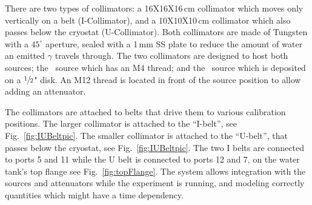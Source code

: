 \begin{figure}
\begin{minipage}[c]{0.4\textwidth}
    \end{minipage} 
    \label{fig:Colimator}
\end{figure}

There are two types of collimators: a 16X16X16\,cm collimator which moves only vertically on a belt (I-Collimator), and a 10X10X10\,cm collimator which also passes below the cryostat (U-Collimator). 
Both collimators are made of Tungsten with a $45^{\circ}$ aperture, sealed with a 1\,mm SS plate to reduce the amount of water an emitted $\gamma$ travels through. 
The two collimators are designed to host both sources; the \Th\ source which has an M4 thread; and the \Cs\ source which is deposited on a $\sfrac{1}{2}$" disk. An M12 thread is located in front of the source position to allow adding an attenuator.
 
The collimators are attached to belts that drive them to various calibration positions. The larger collimator is attached to the ``I-belt'', see Fig.~\ref{fig:IUBeltpic}. The smaller collimator is attached to the ``U-belt'', that passes below the cryostat, see Fig.~\ref{fig:IUBeltpic}. The two I belts are connected to ports 5 and 11 while the U belt is connected to ports 12 and 7, on the water tank's top flange see Fig.~\ref{fig:topFlange}. The system allows integration with the sources and attenuators while the experiment is running, and modeling correctly quantities which might have a time dependency. 


